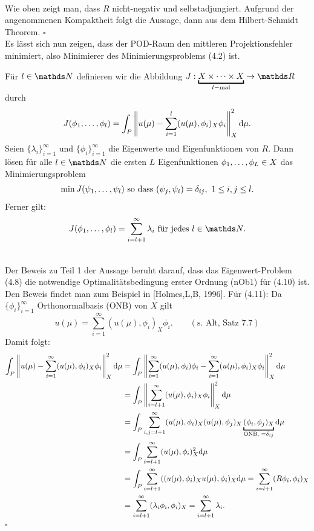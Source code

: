 \\
Wie oben zeigt man, dass $R$ nicht-negativ und selbstadjungiert. 
Aufgrund der angenommenen Kompaktheit folgt die Aussage, dann aus dem Hilbert-Schmidt Theorem.
\hfill $\square$\\

Es lässt sich nun zeigen, dass der POD-Raum den mittleren Projektionsfehler minimiert, also Minimierer des Minimierungsproblems (4.2) ist.

Für $l\in\N$ definieren wir die Abbildung $J: \underbracket{X\dt{\times} X}_{l-\text{mal}}\to \R$ durch
\begin{align}
J(\phi_1, \dots ,\phi_l) = \int_P \left\Vert u(\mu)-\sum_{i=1}^{l} (u(\mu),\phi_i)_X \phi_i\right\Vert_X^2\mathrm{d} \mu.
\end{align}
Seien $\{\lambda_i\}_{i=1}^\infty$ und $\{\phi_i\}_{i=1}^\infty$ die Eigenwerte und Eigenfunktionen von $R$.
Dann lösen für alle $l\in \N$ die ersten $L$ Eigenfunktionen $\phi_1, \dots ,\phi_L\in X$ das Minimierungsproblem
\begin{align}
\min J(\psi_1, \dots ,\psi_l) \text{ so dass } (\psi_j,\psi_i) = \delta_{ij},~1\le i,j\le l.
\end{align}
Ferner gilt:
\begin{align}
J(\phi_1\dt{,}\phi_l) = \sum_{i=l+1}^{\infty} \lambda_i \text{ für jedes } l\in \N.
\end{align}

\\
Der Beweis zu Teil 1 der Aussage beruht darauf, dass das Eigenwert-Problem (4.8) die notwendige Optimalitätsbedingung erster Ordnung (nOb1) für (4.10) ist.
Den Beweis findet man zum Beispiel in [Holmes,L,B, 1996].
Für (4.11):
Da $\{\phi_i\}_{i=1}^\infty$ Orthonormalbasis (ONB) von $X$ gilt
\[
u(\mu) = \sum_{i=1}^{\infty} (u(\mu),\phi_i)_X\phi_i. \qquad(\text{s. Alt, Satz 7.7})
\]
Damit folgt:
\begin{align*}
\int_P \norm{u(\mu)-\sum_{i=1}^{\infty} (u(\mu),\phi_i)_X\phi_i }_X^2\dint \mu &= \int_P \norm{\sum_{i=1}^{\infty}(u(\mu),\phi_i)\phi_i - \sum_{i=1}^{\infty} (u(\mu),\phi_i)_X\phi_i }_X^2\dint \mu\\
&= \int_P \norm{\sum_{i=l+1}^{\infty} (u(\mu),\phi_i)_X\phi_i }_X^2\dint \mu\\
&= \int_P \sum_{i,j=l+1}^{\infty} (u(\mu),\phi_i)_X (u(\mu),\phi_j)_X \underbracket{(\phi_i,\phi_j)_X}_{\text{ONB, }=\delta_{ij}}\dint \mu\\
&= \int_P \sum_{i=l+1}^{\infty} (u(\mu),\phi_i)_X^2\dint \mu \\
&= \int_P \sum_{i=l+1}^{\infty} ((u(\mu),\phi_i)_X u(\mu),\phi_i)_X \dint \mu = \sum_{i=l+1}^{\infty} (R\phi_i,\phi_i)_X \\
&= \sum_{i=l+1}^{\infty} (\lambda_i\phi_i,\phi_i)_X = \sum_{i=l+1}^{\infty} \lambda_i.
\end{align*}
\hfill $\square$

